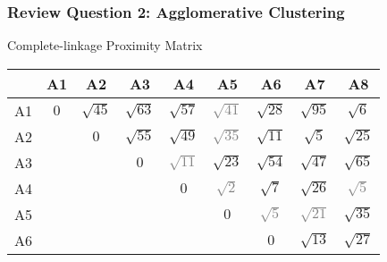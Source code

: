 \documentclass[aspectratio=169, 10pt]{beamer}
\begin{document}
\begin{frame}[t]
    \frametitle{Review Question 2: Agglomerative Clustering}
    \small

    Complete-linkage Proximity Matrix


    \begin{table}[]
        \scriptsize
        \begin{tabular}{c|ccc|cc|ccc}
                                                        & A1  & A2          & A3          & A4                                 & A5                                 & A6                                & A7                                 & A8                                 \\ \hline
        A1                                              & $0$ & $\sqrt{45}$ & $\sqrt{63}$ & {\color[HTML]{3531FF} $\sqrt{57}$} & \textcolor{gray}{$\sqrt{41}$} & $\sqrt{28}$                       & $\sqrt{95}$                        & $\sqrt{6}$                         \\
        A2                                              &     & $0$         & $\sqrt{55}$ & {\color[HTML]{3531FF} $\sqrt{49}$} & \textcolor{gray}{$\sqrt{35}$} & $\sqrt{11}$                       & $\sqrt{5}$                         & $\sqrt{25}$                        \\
        A3                                              &     &             & $0$         & \textcolor{gray}{$\sqrt{11}$} & {\color[HTML]{3531FF} $\sqrt{23}$} & $\sqrt{54}$                       & $\sqrt{47}$                        & $\sqrt{65}$                        \\ \hline
        A4                                              &     &             &             & {\color[HTML]{3531FF} $0$}         & \textcolor{gray}{$\sqrt{2}$}  & {\color[HTML]{3531FF} $\sqrt{7}$} & {\color[HTML]{3531FF} $\sqrt{26}$} & \textcolor{gray}{$\sqrt{5}$}  \\
        A5                                              &     &             &             &                                    & {\color[HTML]{3531FF} $0$}         & \textcolor{gray}{$\sqrt{5}$} & \textcolor{gray}{$\sqrt{21}$} & {\color[HTML]{3531FF} $\sqrt{35}$} \\ \hline
        A6                                              &     &             &             &                                    &                                    & $0$                               & $\sqrt{13}$                        & $\sqrt{27}$                        \\

\end{tabular}
\end{table}
\end{frame}
\end{document}
